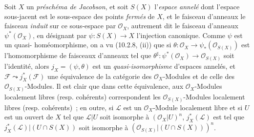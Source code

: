 \begin{env}[10.9.1]
\label{IV.10.9.1-fr}
Soit $X$ un \emph{préschéma de Jacobson}, et soit $S(X)$ l'\emph{espace annelé} dont
l'espace sous-jacent est le sous-espace des points \emph{fermés} de $X$, et le faisceau
d'anneaux le faisceau \emph{induit} sur ce sous-espace par $\mathcal O_X$, autrement dit
le faisceau d'anneaux $\psi^*(\mathcal O_X)$, en désignant par
$\psi:S(X)\to X$ l'injection canonique. Comme $\psi$ est un quasi-%
homéomorphisme, on a vu (10.2.8, (ii)) que si
$\theta:\mathcal O_X\to\psi_*(\mathcal O_{S(X)})$ est l'homomorphisme de
faisceaux d'anneaux tel que
$\theta^\sharp:\psi^*(\mathcal O_X)\to\mathcal O_{S(X)}$ soit l'identité,
alors $j_X=(\psi,\theta)$ est un \emph{quasi-isomorphisme} d'espaces annelés,
et $\mathcal F\leadsto j_X^*(\mathcal F)$ une équivalence de la catégorie des
$\mathcal O_X$-Modules et de celle des $\mathcal O_{S(X)}$-Modules. Il est clair
que dans cette équivalence, aux $\mathcal O_X$-Modules localement libres (resp.
cohérents) correspondent les $\mathcal O_{S(X)}$-Modules localement libres
(resp. cohérents)~; en outre, si $\mathcal L$ est un $\mathcal O_X$-Module
localement libre et si $U$ est un ouvert de $X$ tel que $\mathcal L|U$ soit
isomorphe à $(\mathcal O_X|U)^n$, $j_X^*(\mathcal L)$ est tel que
$j_X^*(\mathcal L)|(U\cap S(X))$ soit isomorphe à
$(\mathcal O_{S(X)}|(U\cap S(X)))^n$.
\end{env}

